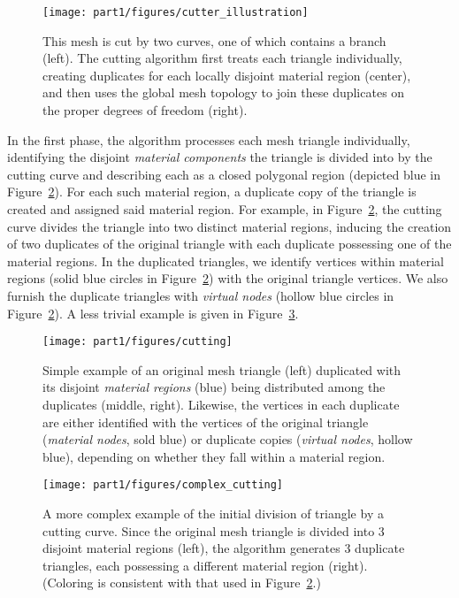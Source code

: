 \setlength{\figurewidth}{\textwidth}
\begin{figure}[htb]
\centering
\texttt{[image: part1/figures/cutter\_illustration]}
\caption{This mesh is cut by two curves, one of which contains a branch (left). The cutting algorithm first treats each triangle individually, creating duplicates for each locally disjoint material region (center), and then uses the global mesh topology to join these duplicates on the proper degrees of freedom (right). }
\label{fig:pt1.cutting.example}
\end{figure}

In the first phase, the algorithm processes each mesh triangle individually, identifying the disjoint \emph{material components} the triangle is divided into by the cutting curve and describing each as a closed polygonal region (depicted blue in Figure~\ref{fig:pt1.cutting.triangle.2}). For each such material region, a duplicate copy of the triangle is created and assigned said material region. For example, in Figure~\ref{fig:pt1.cutting.triangle.2}, the cutting curve divides the triangle into two distinct material regions, inducing the creation of two duplicates of the original triangle with each duplicate possessing one of the material regions. In the duplicated triangles, we identify vertices within material regions (solid blue circles in Figure~\ref{fig:pt1.cutting.triangle.2}) with the original triangle vertices. We also furnish the duplicate triangles with \emph{virtual nodes} (hollow blue circles in Figure~\ref{fig:pt1.cutting.triangle.2}). A less trivial example is given in Figure~\ref{fig:pt1.cutting.triangle.3}.

\setlength{\figureheight}{0.25\textwidth}
\begin{figure}[htb]
\centering
\texttt{[image: part1/figures/cutting]}
\caption{Simple example of an original mesh triangle (left) duplicated with its disjoint \emph{material regions} (blue) being distributed among the duplicates (middle, right). Likewise, the vertices in each duplicate are either identified with the vertices of the original triangle (\emph{material nodes}, sold blue) or duplicate copies (\emph{virtual nodes}, hollow blue), depending on whether they fall within a material region.}
\label{fig:pt1.cutting.triangle.2}
\end{figure}
\begin{figure}[htbp]
\centering
\texttt{[image: part1/figures/complex\_cutting]}
\caption{A more complex example of the initial division of triangle by a cutting curve. Since the original mesh triangle is divided into $3$ disjoint material regions (left), the algorithm generates $3$ duplicate triangles, each possessing a different material region (right). (Coloring is consistent with that used in Figure~\ref{fig:pt1.cutting.triangle.2}.)}
\label{fig:pt1.cutting.triangle.3}
\end{figure}

